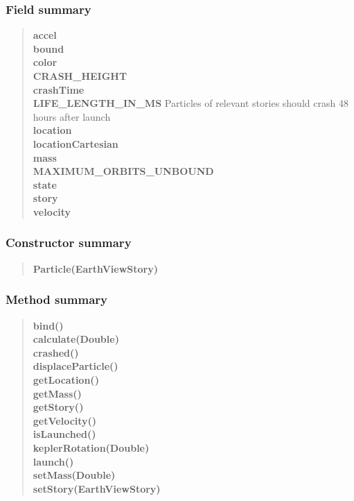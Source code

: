 {{\subsubsection{Field summary}{
\begin{verse}
{\bf accel} \\
{\bf bound} \\
{\bf color} \\
{\bf CRASH\_HEIGHT} \\
{\bf crashTime} \\
{\bf LIFE\_LENGTH\_IN\_MS} Particles of relevant stories should crash 48 hours after launch\\
{\bf location} \\
{\bf locationCartesian} \\
{\bf mass} \\
{\bf MAXIMUM\_ORBITS\_UNBOUND} \\
{\bf state} \\
{\bf story} \\
{\bf velocity} \\
\end{verse}
}
\subsubsection{Constructor summary}{
\begin{verse}
{\bf Particle(EarthViewStory)} \\
\end{verse}
}
\subsubsection{Method summary}{
\begin{verse}
{\bf bind()} \\
{\bf calculate(Double)} \\
{\bf crashed()} \\
{\bf displaceParticle()} \\
{\bf getLocation()} \\
{\bf getMass()} \\
{\bf getStory()} \\
{\bf getVelocity()} \\
{\bf isLaunched()} \\
{\bf keplerRotation(Double)} \\
{\bf launch()} \\
{\bf setMass(Double)} \\
{\bf setStory(EarthViewStory)} \\
\end{verse}
}
}}
